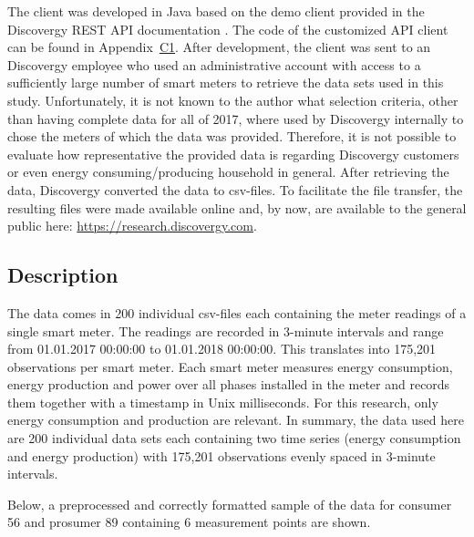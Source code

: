 The client was developed in Java based on the demo client provided in the Discovergy REST API documentation \citep{DiscovergyAPI:2018}. The code of the customized API client can be found in Appendix~\hyperlink{AppC1:Code:API}{C1}. After development, the client was sent to an Discovergy employee who used an administrative account with access to a sufficiently large number of smart meters to retrieve the data sets used in this study. Unfortunately, it is not known to the author what selection criteria, other than having complete data for all of 2017, where used by Discovergy internally to chose the meters of which the data was provided. Therefore, it is not possible to evaluate how representative the provided data is regarding Discovergy customers or even energy consuming/producing household in general.
After retrieving the data, Discovergy converted the data to csv-files. To facilitate the file transfer, the resulting files were made available online and, by now, are available to the general public here: \url{https://research.discovergy.com}. 




\subsection{Description}\label{Sec:Data;Subsec:Description}

The data comes in 200 individual csv-files each containing the meter readings of a single smart meter. The readings are recorded in 3-minute intervals and range from 01.01.2017 00:00:00 to 01.01.2018 00:00:00. This translates into 175,201 observations per smart meter. Each smart meter measures energy consumption, energy production and power over all phases installed in the meter and records them together with a timestamp in Unix milliseconds. For this research, only energy consumption and production are relevant. In summary, the data used here are 200 individual data sets each containing two time series (energy consumption and energy production) with 175,201 observations evenly spaced in 3-minute intervals.

Below, a preprocessed and correctly formatted sample of the data for consumer 56 and prosumer 89 containing 6 measurement points are shown.

